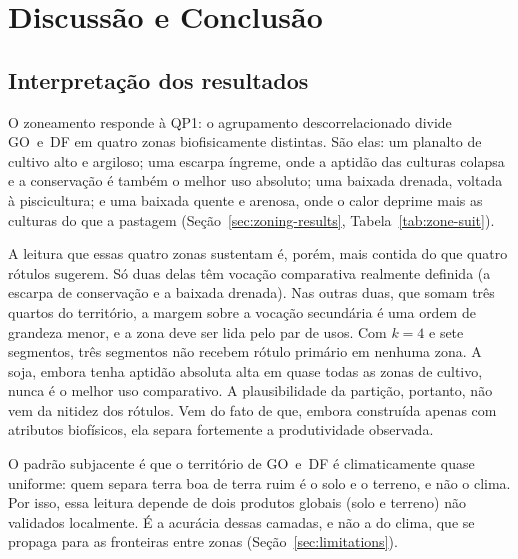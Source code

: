 \chapter{Discussão e Conclusão}\label{ch:discussion}

\section{Interpretação dos resultados}\label{sec:interpretation}

O zoneamento responde à QP1: o agrupamento descorrelacionado divide GO~e~DF em quatro zonas
biofisicamente distintas. São elas: um planalto de cultivo alto e argiloso; uma escarpa íngreme, onde a
aptidão das culturas colapsa e a conservação é também o melhor uso absoluto; uma baixada drenada,
voltada à piscicultura; e uma baixada quente e arenosa, onde o calor deprime mais as culturas do que a
pastagem (Seção~\ref{sec:zoning-results}, Tabela~\ref{tab:zone-suit}).

A leitura que essas quatro zonas sustentam é, porém, mais contida do que quatro rótulos sugerem.
Só duas delas têm vocação comparativa realmente definida (a escarpa de conservação e a baixada
drenada). Nas outras duas, que somam três quartos do território, a margem sobre a vocação
secundária é uma ordem de grandeza menor, e a zona deve ser lida pelo par de usos. Com $k = 4$ e sete
segmentos, três segmentos não recebem rótulo primário em nenhuma zona. A soja, embora tenha aptidão
absoluta alta em quase todas as zonas de cultivo, nunca é o melhor uso comparativo. A plausibilidade
da partição, portanto, não vem da nitidez dos rótulos. Vem do fato de que, embora construída apenas
com atributos biofísicos, ela separa fortemente a produtividade observada.

O padrão subjacente é que o território de GO~e~DF é climaticamente quase uniforme: quem separa terra
boa de terra ruim é o solo e o terreno, e não o clima. Por isso, essa leitura depende de dois produtos
globais (solo e terreno) não validados localmente. É a acurácia dessas camadas, e não a do clima, que
se propaga para as fronteiras entre zonas (Seção~\ref{sec:limitations}).

